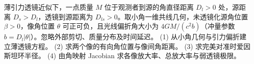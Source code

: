 薄引力透镜近似下，一点质量 \(M\) 位于观测者到源的角直径距离 \(D_l>0\) 处，源距离 \(D_s>D_l\)，透镜到源距离为 \(D_{ls}>0\)。取小角一维共线几何，未透镜化源角位置 \(\beta>0\)，像角位置 \(\theta\) 可正可负，且光线偏折角大小为 \(4GM/(c^2b)\)（冲量参数 \(b=D_l|\theta|\)）。忽略外部剪切、质量分布及时间延迟。
(1) 从小角几何与引力偏折建立薄透镜方程。
(2) 求两个像的有向角位置与像间角距离。
(3) 求完美对准时爱因斯坦环半径。
(4) 由角映射 Jacobian 求各像放大率、总放大率与弱透镜极限。
